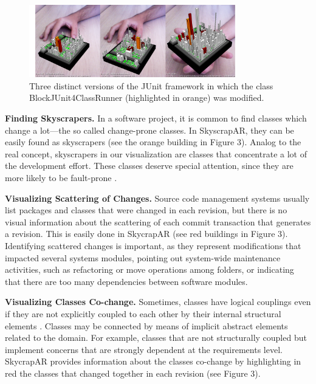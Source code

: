 \begin{figure}[t]
 \centering
 \includegraphics[width=0.8\textwidth, bb=14 14 2114 755]{./images/applications}
 \caption{Three distinct versions of the JUnit framework in which the class BlockJUnit4ClassRunner (highlighted in orange) was modified.}
 \label{fig:TOBEDEFINED}
\end{figure}

\textbf{Finding Skyscrapers.} In a software project, it is common to find classes which change a lot---the so called change-prone classes. In SkyscrapAR, they can be easily found as skyscrapers (see the orange building in Figure 3). Analog to the real concept, skyscrapers in our visualization are classes that concentrate a lot of the development effort. These classes deserve special attention, since they are more likely to be fault-prone \cite{nagappan:2005}. 

\textbf{Visualizing Scattering of Changes.} Source code management systems usually list packages and classes that were changed in each revision, but there is no visual information about the scattering of each commit transaction that generates a revision. This is easily done in SkycrapAR (see red buildings in Figure 3). Identifying scattered changes is important, as they represent modifications that impacted several systems modules, pointing out system-wide maintenance activities, such as refactoring or move operations among folders, or indicating that there are too many dependencies between software modules.

\textbf{Visualizing Classes Co-change.} Sometimes, classes have logical couplings even if they are not explicitly coupled to each other by their internal structural elements \cite{gall:1998}. Classes may be connected by means of implicit abstract elements related to the domain. For example, classes that are not structurally coupled but implement concerns that are strongly dependent at the requirements level. SkycrapAR provides information about the classes co-change by highlighting in red the classes that changed together in each revision (see Figure 3). 

